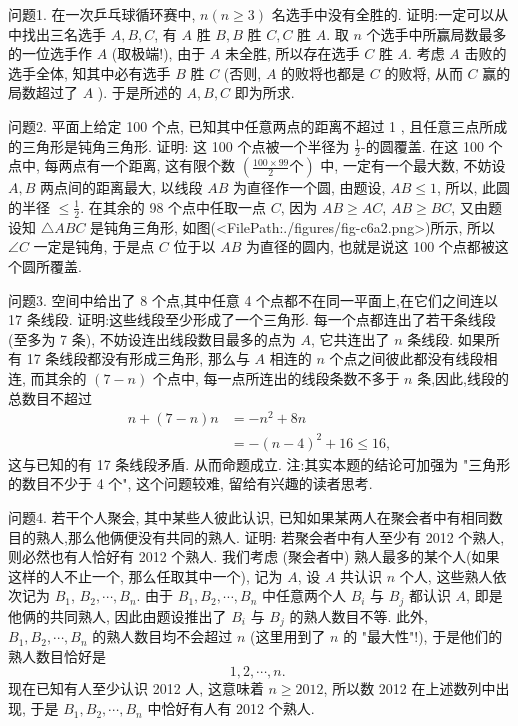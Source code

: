 
问题1. 在一次乒乓球循环赛中, $n(n \geqslant 3)$ 名选手中没有全胜的.
证明:一定可以从中找出三名选手 $A, B, C$, 有 $A$ 胜 $B, B$ 胜 $C, C$ 胜 $A$.
取 $n$ 个选手中所赢局数最多的一位选手作 $A$ (取极端!), 由于 $A$ 未全胜, 所以存在选手 $C$ 胜 $A$. 考虑 $A$ 击败的选手全体, 知其中必有选手 $B$ 胜 $C$ (否则, $A$ 的败将也都是 $C$ 的败将, 从而 $C$ 赢的局数超过了 $A$ ). 于是所述的 $A, B, C$ 即为所求.



问题2. 平面上给定 100 个点, 已知其中任意两点的距离不超过 1 , 且任意三点所成的三角形是钝角三角形.
证明: 这 100 个点被一个半径为 $\frac{1}{2}$-的圆覆盖.
在这 100 个点中, 每两点有一个距离, 这有限个数 $\left(\frac{100 \times 99}{2} 个 \right)$ 中, 一定有一个最大数, 不妨设 $A, B$ 两点间的距离最大, 以线段 $A B$ 为直径作一个圆, 由题设, $A B \leqslant 1$, 所以, 此圆的半径 $\leqslant \frac{1}{2}$.
在其余的 98 个点中任取一点 $C$, 因为 $A B \geqslant A C$, $A B \geqslant B C$, 又由题设知 $\triangle A B C$ 是钝角三角形, 如图(<FilePath:./figures/fig-c6a2.png>)所示, 所以 $\angle C$ 一定是钝角, 于是点 $C$ 位于以 $A B$ 为直径的圆内, 也就是说这 100 个点都被这个圆所覆盖.



问题3. 空间中给出了 8 个点,其中任意 4 个点都不在同一平面上,在它们之间连以 17 条线段.
证明:这些线段至少形成了一个三角形.
每一个点都连出了若干条线段 (至多为 7 条), 不妨设连出线段数目最多的点为 $A$, 它共连出了 $n$ 条线段.
如果所有 17 条线段都没有形成三角形, 那么与 $A$ 相连的 $n$ 个点之间彼此都没有线段相连, 而其余的 $(7-n)$ 个点中, 每一点所连出的线段条数不多于 $n$ 条,因此,线段的总数目不超过
$$
\begin{aligned}
n+(7-n) n & =-n^2+8 n \\
& =-(n-4)^2+16 \leqslant 16,
\end{aligned}
$$
这与已知的有 17 条线段矛盾.
从而命题成立.
注:其实本题的结论可加强为 "三角形的数目不少于 4 个", 这个问题较难, 留给有兴趣的读者思考.



问题4. 若干个人聚会, 其中某些人彼此认识, 已知如果某两人在聚会者中有相同数目的熟人,那么他俩便没有共同的熟人.
证明: 若聚会者中有人至少有 2012 个熟人,则必然也有人恰好有 2012 个熟人.
我们考虑 (聚会者中) 熟人最多的某个人(如果这样的人不止一个, 那么任取其中一个), 记为 $A$, 设 $A$ 共认识 $n$ 个人, 这些熟人依次记为 $B_1$, $B_2, \cdots, B_n$.
由于 $B_1, B_2, \cdots, B_n$ 中任意两个人 $B_i$ 与 $B_j$ 都认识 $A$, 即是他俩的共同熟人, 因此由题设推出了 $B_i$ 与 $B_j$ 的熟人数目不等.
此外, $B_1, B_2, \cdots, B_n$ 的熟人数目均不会超过 $n$ (这里用到了 $n$ 的 "最大性"!), 于是他们的熟人数目恰好是
$$
1,2, \cdots, n \text {. }
$$
现在已知有人至少认识 2012 人, 这意味着 $n \geqslant 2012$, 所以数 2012 在上述数列中出现, 于是 $B_1, B_2, \cdots, B_n$ 中恰好有人有 2012 个熟人.



